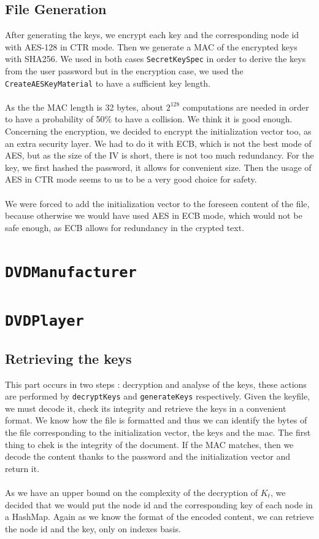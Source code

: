 \documentclass[a4paper,titlepage]{article}
\begin{document}
	\subsection{File Generation}
	After generating the keys, we encrypt each key and the corresponding node id with AES-128 in CTR mode. Then we generate a MAC of the encrypted   	keys with SHA256. We used in both cases \texttt{SecretKeySpec} in order to derive the keys from the user password but in the encryption case, we used the \texttt{CreateAESKeyMaterial} to have a sufficient key length. \\ \\ 
	As the the MAC length is 32 bytes, about $2^{128}$ computations are needed in order to have a probability of 50\% to have a collision. We think it is good enough. Concerning the encryption, we decided to encrypt the initialization vector too, as an extra security layer. We had to do it with ECB, which is not the best mode of AES, but as the size of the IV is short, there is not too much redundancy. For the key, we first hashed the password, it allows for convenient size. Then the usage of AES in CTR mode seems to us to be a very good choice for safety. \\ \\
	We were forced to add the initialization vector to the foreseen content of the file, because otherwise we would have used AES in ECB mode, which would not be safe enough, as ECB allows for redundancy in the crypted text.

\section{\texttt{DVDManufacturer}}

\section{\texttt{DVDPlayer}}
\subsection{Retrieving the keys}
This part occurs in two steps : decryption and analyse of the keys, these actions are performed by \texttt{decryptKeys} and \texttt{generateKeys} respectively.
Given the keyfile, we must decode it, check its integrity and retrieve the keys in a convenient format. We know how the file is formatted and thus we can identify the bytes of the file corresponding to the initialization vector, the keys and the mac. The first thing to chek is the integrity of the document. If the MAC matches, then we decode the content thanks to the password and the initialization vector and return it. \\ \\

As we have an upper bound on the complexity of the decryption of $K_t$, we decided that we would put the node id and the corresponding key of each node in a HashMap. Again as we know the format of the encoded content, we can retrieve the node id and the key, only on indexes basis.
\end{document}
